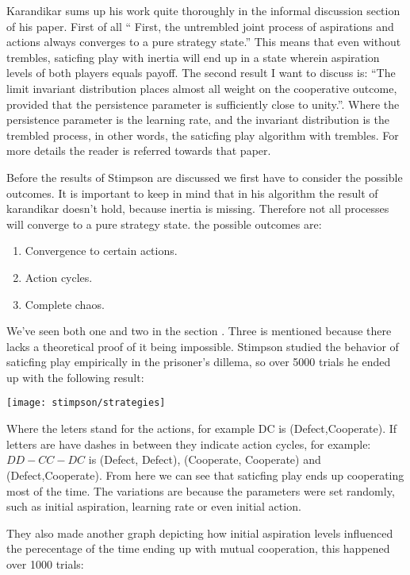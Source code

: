 Karandikar sums up his work quite thoroughly in  the informal discussion section
of his paper. First of all ``   First, the untrembled joint process of
aspirations and actions always converges to a pure strategy state.''
This means that even without trembles, saticfing play with inertia
will end up in a state wherein aspiration levels of both players equals payoff.
The second result I want to discuss is:
``The limit invariant distribution places
almost all weight on the cooperative outcome, provided that the persistence
parameter is sufficiently close to unity.''. Where the persistence parameter
is the learning rate, and the invariant distribution is the trembled process,
in other words, the saticfing play algorithm with trembles. For more details
the reader is referred towards that paper.

Before the results of Stimpson are discussed we first have to consider the
possible outcomes. It is important to keep in mind that in his algorithm
the result of karandikar doesn't hold, because inertia is missing. Therefore
not all processes will converge to a pure strategy state.
the possible outcomes are:
\begin{enumerate}
  \item Convergence to certain actions.
  \item Action cycles.
  \item Complete chaos.
\end{enumerate}
We've seen both one and two in the section . Three
is mentioned because there lacks a theoretical proof of it being impossible.
Stimpson studied the behavior of saticfing play empirically in the prisoner's
dillema, so over 5000 trials he ended up with the following result:

\texttt{[image: stimpson/strategies]}

Where the leters stand for the actions, for example DC is (Defect,Cooperate).
If letters are have dashes in between they indicate action cycles, for example:
$DD-CC-DC$ is (Defect, Defect), (Cooperate, Cooperate) and 
(Defect,Cooperate).
From here we can see that saticfing play ends up cooperating most of the time.
The variations are because the parameters were set randomly, such as initial
aspiration, learning rate or even initial action.

They also made another graph depicting how initial aspiration levels influenced
the perecentage of the time ending up with mutual cooperation, this happened
over 1000 trials:

